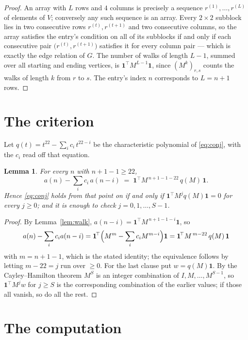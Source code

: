 \documentclass[11pt,a4paper]{article}
\theoremstyle{plain}
\newtheorem{lemma}[theorem]{Lemma}
\theoremstyle{definition}
\begin{document}
\begin{proof}
An array with $L$ rows and $4$ columns is precisely a sequence
$r^{(1)},\dots,r^{(L)}$ of elements of $V$; conversely any such sequence is an array.
Every $2\times2$ subblock lies in two consecutive rows $r^{(t)},r^{(t+1)}$ and two
consecutive columns, so the array satisfies the entry's condition on all of its subblocks
if and only if each consecutive pair $\bigl(r^{(t)},r^{(t+1)}\bigr)$ satisfies it for
every column pair --- which is exactly the edge relation of $G$. The number of walks of
length $L-1$, summed over all starting and ending vertices, is
$\mathbf{1}^{\!\top}M^{L-1}\mathbf{1}$, since $(M^{k})_{r,s}$ counts the walks of
length $k$ from $r$ to $s$. The entry's index $n$ corresponds to $L=n+1$ rows.
\end{proof}

\section{The criterion}

Let $q(t)=t^{22}-\sum_i c_i\,t^{22-i}$ be the characteristic polynomial of
\eqref{eq:conj}, with the $c_i$ read off that equation.

\begin{lemma}\label{lem:crit}
For every $n$ with $n+1-1\ge22$,
\[
a(n)-\sum_i c_i\,a(n-i)\;=\;\mathbf{1}^{\!\top}M^{\,n+1-1-22}\,q(M)\,\mathbf{1} .
\]
Hence \eqref{eq:conj} holds from that point on if and only if
$\mathbf{1}^{\!\top}M^{j}q(M)\mathbf{1}=0$ for every $j\ge0$; and it is enough to check
$j=0,1,\dots,S-1$.
\end{lemma}

\begin{proof}
By Lemma~\ref{lem:walk}, $a(n-i)=\mathbf{1}^{\!\top}M^{\,n+1-1-i}\mathbf{1}$, so
\[
a(n)-\sum_i c_i a(n-i)
=\mathbf{1}^{\!\top}\Bigl(M^{m}-\sum_i c_i M^{m-i}\Bigr)\mathbf{1}
=\mathbf{1}^{\!\top}M^{\,m-22}\,q(M)\,\mathbf{1}
\]
with $m=n+1-1$, which is the stated identity; the equivalence follows by letting
$m-22=j$ run over $\ge0$. For the last clause put $w=q(M)\mathbf{1}$. By the
Cayley--Hamilton theorem $M^{S}$ is an integer combination of $I,M,\dots,M^{S-1}$, so
$\mathbf{1}^{\!\top}M^{j}w$ for $j\ge S$ is the corresponding combination of the earlier
values; if those all vanish, so do all the rest.
\end{proof}

\section{The computation}
\end{document}
